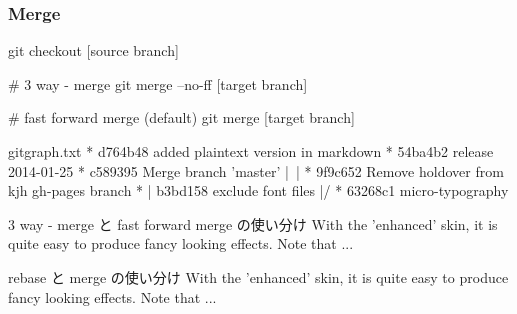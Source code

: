 \documentclass[10pt,a4j,openany,dvipdfmx]{jsarticle}
\begin{document}
\subsubsection{Merge} %
\label{ssub:merge}

\begin{commandshell}
git checkout [source branch]

# 3 way - merge
git merge --no-ff [target branch]

# fast forward merge (default)
git merge [target branch]
\end{commandshell}


\begin{filecontents}{gitgraph.txt}
* d764b48 added plaintext version in markdown
* 54ba4b2 release 2014-01-25
*   c589395 Merge branch 'master'
|\
| * 9f9c652 Remove holdover from kjh gh-pages branch
* | b3bd158 exclude font files
|/
* 63268c1 micro-typography
\end{filecontents}



\begin{oceanbox}{3 way - merge と fast forward merge の使い分け}
With the 'enhanced' skin, it is quite easy to produce fancy looking effects.
\tcblower
Note that ...
\end{oceanbox}


\begin{oceanbox}{rebase と merge の使い分け}
With the 'enhanced' skin, it is quite easy to produce fancy looking effects.
\tcblower
Note that ...
\end{oceanbox}
\end{document}
